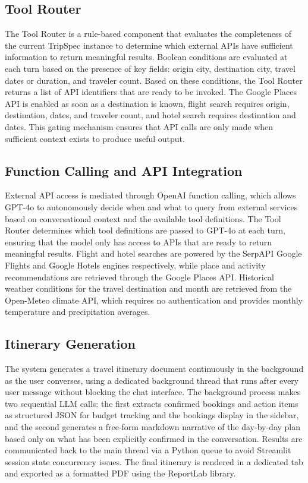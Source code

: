 \documentclass{article}
\begin{document}
\subsection{Tool Router}
The Tool Router is a rule-based component that evaluates the completeness of the current TripSpec instance to determine which external APIs have sufficient information to return meaningful results. Boolean conditions are evaluated at each turn based on the presence of key fields: origin city, destination city, travel dates or duration, and traveler count. Based on these conditions, the Tool Router returns a list of API identifiers that are ready to be invoked. The Google Places API is enabled as soon as a destination is known, flight search requires origin, destination, dates, and traveler count, and hotel search requires destination and dates. This gating mechanism ensures that API calls are only made when sufficient context exists to produce useful output. 

\subsection{Function Calling and API Integration}
External API access is mediated through OpenAI function calling, which allows GPT-4o to autonomously decide when and what to query from external services based on conversational context and the available tool definitions. The Tool Router determines which tool definitions are passed to GPT-4o at each turn, ensuring that the model only has access to APIs that are ready to return meaningful results. Flight and hotel searches are powered by the SerpAPI Google Flights and Google Hotels engines respectively, while place and activity recommendations are retrieved through the Google Places API. Historical weather conditions for the travel destination and month are retrieved from the Open-Meteo climate API, which requires no authentication and provides monthly temperature and precipitation averages.

\subsection{Itinerary Generation}
The system generates a travel itinerary document continuously in the background as the user converses, using a dedicated background thread that runs after every user message without blocking the chat interface. The background process makes two sequential LLM calls: the first extracts confirmed bookings and action items as structured JSON for budget tracking and the bookings display in the sidebar, and the second generates a free-form markdown narrative of the day-by-day plan based only on what has been explicitly confirmed in the conversation. Results are communicated back to the main thread via a Python queue to avoid Streamlit session state concurrency issues. The final itinerary is rendered in a dedicated tab and exported as a formatted PDF using the ReportLab library.
\end{document}
